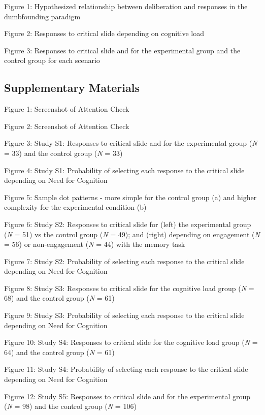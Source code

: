 \documentclass[
  man,floatsintext]{apa6}
\begin{document}
Figure 1: Hypothesized relationship between deliberation and responses in the dumbfounding paradigm

Figure 2: Responses to critical slide depending on cognitive load

Figure 3: Responses to critical slide and for the experimental group and the control group for each scenario

\hypertarget{supplementary-materials}{%
\subsection{Supplementary Materials}\label{supplementary-materials}}

Figure 1: Screenshot of Attention Check

Figure 2: Screenshot of Attention Check

Figure 3: Study S1: Responses to critical slide and for the experimental group (\emph{N} = 33) and the control group (\emph{N} = 33)

Figure 4: Study S1: Probability of selecting each response to the critical slide depending on Need for Cognition

Figure 5: Sample dot patterns - more simple for the control group (a) and higher complexity for the experimental condition (b)

Figure 6: Study S2: Responses to critical slide for (left) the experimental group (\emph{N} = 51) vs the control group (\emph{N} = 49); and (right) depending on engagement (\emph{N} = 56) or non-engagement (\emph{N} = 44) with the memory task

Figure 7: Study S2: Probability of selecting each response to the critical slide depending on Need for Cognition

Figure 8: Study S3: Responses to critical slide for the cognitive load group (\emph{N} = 68) and the control group (\emph{N} = 61)

Figure 9: Study S3: Probability of selecting each response to the critical slide depending on Need for Cognition

Figure 10: Study S4: Responses to critical slide for the cognitive load group (\emph{N} = 64) and the control group (\emph{N} = 61)

Figure 11: Study S4: Probability of selecting each response to the critical slide depending on Need for Cognition

Figure 12: Study S5: Responses to critical slide and for the experimental group (\emph{N} = 98) and the control group (\emph{N} = 106)
\end{document}
